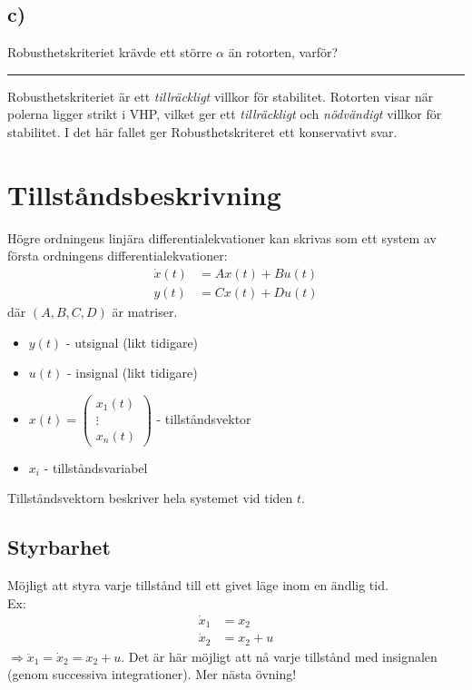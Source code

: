 \documentclass[12pt]{article}
\newcommand{\qline}{\hrule \vspace*{10pt}}
\begin{document}
\subsection*{c)}
Robusthetskriteriet krävde ett större $\alpha$ än rotorten, varför?
\qline
Robusthetskriteriet är ett \emph{tillräckligt} villkor för stabilitet. Rotorten visar när polerna ligger strikt i VHP, vilket ger ett \emph{tillräckligt} och \emph{nödvändigt} villkor för stabilitet. I det här fallet ger Robusthetskriteret ett konservativt svar.

\section*{Tillståndsbeskrivning}
Högre ordningens linjära differentialekvationer kan skrivas som ett system av första ordningens differentialekvationer:
\begin{align*}
   \dot{x}(t) &= Ax(t) + Bu(t) \\
  y(t) &= Cx(t) + Du(t)
\end{align*}
där $(A,B,C,D)$ är matriser.
\begin{itemize}
\item $y(t)$ - utsignal (likt tidigare)
\item $u(t)$ - insignal (likt tidigare)
\item $x(t) =
  \begin{pmatrix}
    x_1(t) \\
    \vdots \\
    x_n(t)
  \end{pmatrix}$ - tillståndsvektor
\item  $x_i$ - tillståndsvariabel
\end{itemize}
Tillståndsvektorn beskriver hela systemet vid tiden $t$.

\subsection*{Styrbarhet}
Möjligt att styra varje tillstånd till ett givet läge inom en ändlig tid. \\
Ex: \\
\begin{align*}
  \dot{x}_1 &= x_2 \\
  \dot{x}_2 &= x_2 + u
\end{align*}
$\Rightarrow \ddot{x}_1 = \dot{x}_2 = x_2 + u$. Det är här möjligt att nå varje tillstånd med insignalen (genom successiva integrationer). Mer nästa övning!
\end{document}
